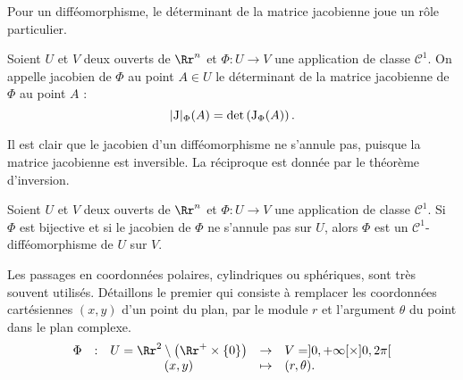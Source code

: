 \documentclass[12pt, class=report,crop=false]{standalone}
\begin{document}
\vskip4mm

\noindent Pour un difféomorphisme, le déterminant de la matrice jacobienne joue un r\^ole particulier.

\vskip6mm

\begin{definition}Soient $U$ et $V$ deux ouverts de $\Rr^n$ et $\Phi:U\to V$ une application de classe ${\mathscr C}^1$. On appelle jacobien de $\Phi$ au point $A\in U$ le déterminant de la matrice jacobienne de $\Phi$ au point $A$ :
$$|\mathrm{J}| _{\Phi}(A)=\det \left(\mathrm{J} _{\Phi}(A)\right).$$
\end{definition}

\vskip4mm

\noindent Il est clair que le jacobien d'un difféomorphisme ne s'annule pas, puisque la matrice jacobienne est inversible. La réciproque est donnée par le théorème d'inversion.

\vskip6mm

\begin{theoreme}[d'inversion]Soient $U$ et $V$ deux ouverts de $\Rr^n$ et $\Phi:U\to V$ une application de classe ${\mathscr C}^1$. Si $\Phi$ est bijective et si le jacobien de $\Phi$ ne s'annule pas sur $U$, alors $\Phi$ est un ${\mathscr C}^1$-difféomorphisme de $U$ sur $V$.
\end{theoreme}

\vskip4mm

Les passages en coordonnées polaires, cylindriques ou sphériques, sont très souvent utilisés. Détaillons le premier qui consiste à remplacer les coordonnées cartésiennes $(x,y)$ d'un point du plan, par le module $r$ et l'argument $\theta$ du point dans le plan complexe.
$$\begin{array}{ccccl}\Phi &:&U=\Rr^2\setminus \left(\Rr^+\times\{0\}\right)&\to&V=]0,+\infty [\times ]0,2\pi [\\&&(x,y)&\mapsto &\displaystyle (r,\theta).\end{array}$$

\vskip4mm
\end{document}
